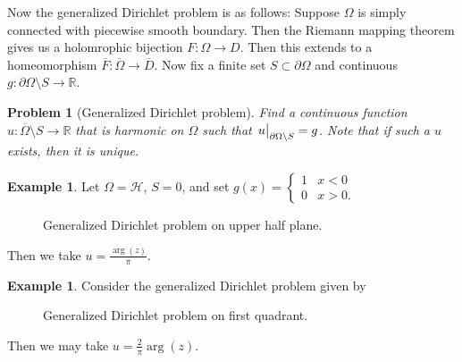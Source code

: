 \documentclass[leqno, openany]{memoir}
\newtheorem{prob}[thm]{Problem}
\theoremstyle{definition}
\newtheorem{exm}[thm]{Example}
\theoremstyle{remark}
\theoremstyle{plain}
\theoremstyle{definition}
\theoremstyle{remark}
\newcommand{\R}{\mathbb{R}}
\newcommand{\mc}[1]{\mathcal{#1}}
\newcommand{\ol}[1]{\overline{#1}}
\begin{document}
Now the generalized Dirichlet problem is as follows: Suppose $\Omega$ is simply connected with piecewise smooth boundary. Then the Riemann mapping theorem gives us a holomrophic bijection $F \colon \Omega \to D$. Then this extends to a homeomorphism $\ol{F} \colon \ol{\Omega} \to \ol{D}$. Now fix a finite set $S \subset \partial \Omega$ and continuous $g \colon \partial \Omega \setminus S \to \R$. 

\begin{prob}[Generalized Dirichlet problem]
    Find a continuous function $u \colon \ol{\Omega} \setminus S \to \R$ that is harmonic on $\Omega$ such that $\eval{u}_{\partial \Omega \setminus S} = g$. Note that if such a $u$ exists, then it is unique.
\end{prob}

\begin{exm}
    Let $\Omega = \mc{H}$, $S = 0$, and set $g(x) = \begin{cases}
        1 & x < 0 \\
        0 & x > 0.
    \end{cases}$
    \begin{figure}[H]
    \begin{center}
    \end{center}
    \caption{Generalized Dirichlet problem on upper half plane.}%
    \label{fig:}
    \end{figure}
    Then we take $u = \frac{\arg(z)}{\pi}$.
\end{exm}

\begin{exm}
    Consider the generalized Dirichlet problem given by
    \begin{figure}[H]
    \begin{center}
    \end{center}
    \caption{Generalized Dirichlet problem on first quadrant.}%
    \label{fig:}
    \end{figure}
    Then we may take $u = \frac{2}{\pi} \arg(z)$.
\end{exm}
\end{document}
